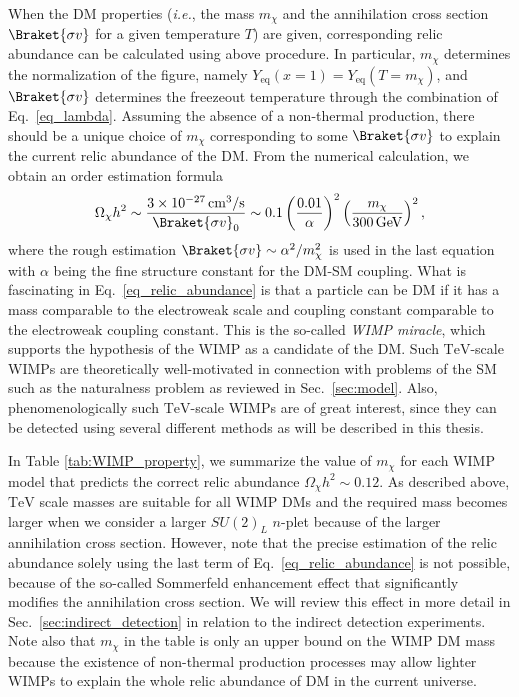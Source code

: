 \documentclass[12pt,twoside,book]{article}
\begin{document}
When the DM properties (\textit{i.e.}, the mass $m_\chi$ and the annihilation cross section $\Braket{\sigma v}$ for a given temperature $T$) are given, corresponding relic abundance can be calculated using above procedure.
In particular, $m_\chi$ determines the normalization of the figure, namely $Y_{\mathrm{eq}} (x=1) = Y_{\mathrm{eq}} (T=m_\chi)$, and $\Braket{\sigma v}$ determines the freezeout temperature through the combination of Eq.~\eqref{eq_lambda}.
Assuming the absence of a non-thermal production, there should be a unique choice of $m_\chi$ corresponding to some $\Braket{\sigma v}$ to explain the current relic abundance of the DM.
From the numerical calculation, we obtain an order estimation formula
\begin{align}
  \Omega_\chi h^2 \sim \frac{3 \times 10^{-27}\,\mathrm{cm^3}/\mathrm{s}}
  {\Braket{\sigma v}_0} \sim
  0.1 \left( \frac{0.01}{\alpha} \right)^2
  \left( \frac{m_\chi}{300\,\mathrm{GeV}} \right)^2,\label{eq_relic_abundance}
\end{align}
where the rough estimation $\Braket{\sigma v} \sim \alpha^2/m_\chi^2$ is used in the last equation with $\alpha$ being the fine structure constant for the DM-SM coupling.
What is fascinating in Eq.~\eqref{eq_relic_abundance} is that a particle can be DM if it has a mass comparable to the electroweak scale and coupling constant comparable to the electroweak coupling constant.
This is the so-called \textit{WIMP miracle}, which supports the hypothesis of the WIMP as a candidate of the DM.
Such $\mathrm{TeV}$-scale WIMPs are theoretically well-motivated in connection with problems of the SM such as the naturalness problem as reviewed in Sec.~\ref{sec:model}.
Also, phenomenologically such $\mathrm{TeV}$-scale WIMPs are of great interest, since they can be detected using several different methods as will be described in this thesis.

In Table \ref{tab:WIMP_property}, we summarize the value of $m_\chi$ for each WIMP model that predicts the correct relic abundance $\Omega_\chi h^2 \sim 0.12$.
As described above, $\mathrm{TeV}$ scale masses are suitable for all WIMP DMs and the required mass becomes larger when we consider a larger $SU(2)_L$ $n$-plet because of the larger annihilation cross section.
However, note that the precise estimation of the relic abundance solely using the last term of Eq.~\eqref{eq_relic_abundance} is not possible, because of the so-called Sommerfeld enhancement effect \cite{Hisano:2004ds,Hisano:2006nn} that significantly modifies the annihilation cross section.
We will review this effect in more detail in Sec.~\ref{sec:indirect_detection} in relation to the indirect detection experiments.
Note also that $m_\chi$ in the table is only an upper bound on the WIMP DM mass because the existence of non-thermal production processes may allow lighter WIMPs to explain the whole relic abundance of DM in the current universe.
\end{document}
